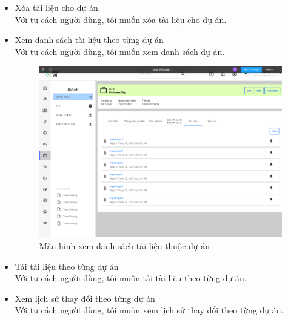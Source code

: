 \documentclass[12pt,a4paper]{article}
\begin{document}
\begin{enumerate}
\begin{itemize}
            \item Xóa tài liệu cho dự án \\
            Với tư cách người dùng, tôi muốn xóa tài liệu cho dự án.

            \item Xem danh sách tài liệu theo từng dự án \\
            Với tư cách người dùng, tôi muốn xem danh sách dự án.


            \begin{figure}[H]
                \centering \includegraphics[width=\textwidth]{Img/Nguyet/DuAn/tailieu.png}
                \vspace{0.5cm}
                \caption{Màn hình xem danh sách tài liệu thuộc dự án }
                \label{tlduan}
            \end{figure}

            \item Tải tài liệu theo từng dự án \\
            Với tư cách người dùng, tôi muốn tải tài liệu theo từng dự án.

            \item Xem lịch sử thay đổi theo từng dự án \\
            Với tư cách người dùng, tôi muốn xem lịch sử thay đổi theo từng dự án.



\end{itemize}
\end{enumerate}
\end{document}

